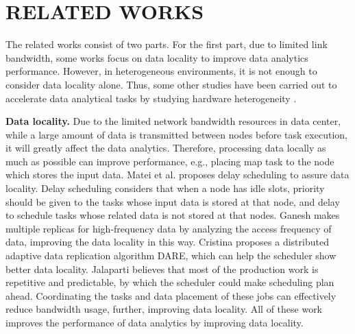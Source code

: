\documentclass[conference]{IEEEtran}
\begin{document}
\section{RELATED WORKS}\label{RELATED_WORKS}
The related works consist of two parts. For the first part, due to limited link bandwidth, some works focus on data locality to improve data analytics performance. However, in heterogeneous environments, it is not enough to consider data locality alone. Thus, some other studies have been carried out to accelerate data analytical tasks by studying hardware heterogeneity \cite{b1}.

\textbf{Data locality.} Due to the limited network bandwidth resources in data center, while a large amount of data is transmitted between nodes before task execution, it will greatly affect the data analytics. Therefore, processing data locally as much as possible can improve performance, e.g., placing map task to the node which stores the input data. Matei et al. \cite{b2} proposes delay scheduling to assure data locality. Delay scheduling considers that when a node has idle slots, priority should be given to  the tasks whose input data is stored at that node, and delay to schedule tasks whose related data is not stored at that nodes. Ganesh \cite{b3} makes multiple replicas for high-frequency data by analyzing the access frequency of data, improving the data locality in this way. Cristina \cite{b4} proposes a distributed adaptive data replication algorithm DARE, which can help the scheduler show better data locality. Jalaparti \cite{b5} believes that most of the production work is repetitive and predictable, by which the scheduler could make scheduling plan ahead. Coordinating the tasks and data placement of these jobs can effectively reduce bandwidth usage, further, improving data locality. All of these work improves the performance of data analytics by improving data locality.
\end{document}
